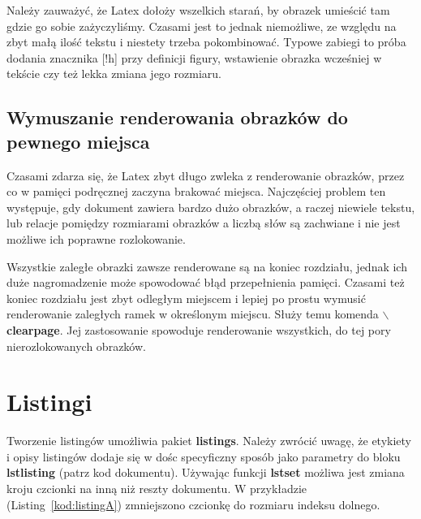 \documentclass[twoside,a4paper]{book}
\begin{document}
Należy zauważyć, że Latex dołoży wszelkich starań, by obrazek umieścić tam gdzie go sobie zażyczyliśmy. Czasami jest to jednak niemożliwe, ze względu na zbyt małą ilość tekstu i niestety trzeba pokombinować. Typowe zabiegi to próba dodania znacznika [!h] przy definicji figury, wstawienie obrazka wcześniej w tekście czy też lekka zmiana jego rozmiaru.

\subsection{Wymuszanie renderowania obrazków do pewnego miejsca}

Czasami zdarza się, że Latex zbyt długo zwleka z renderowanie obrazków, przez co w pamięci podręcznej zaczyna brakować miejsca. Najczęściej problem ten występuje, gdy dokument zawiera bardzo dużo obrazków, a raczej niewiele tekstu, lub relacje pomiędzy rozmiarami obrazków a liczbą słów są zachwiane i nie jest możliwe ich poprawne rozlokowanie.

Wszystkie zaległe obrazki zawsze renderowane są na koniec rozdziału, jednak ich duże nagromadzenie może spowodować błąd przepełnienia pamięci. Czasami też koniec rozdziału jest zbyt odległym miejscem i lepiej po prostu wymusić renderowanie zaległych ramek w określonym miejscu. Służy temu komenda \textbf{$\backslash$clearpage}. Jej zastosowanie spowoduje renderowanie wszystkich, do tej pory nierozlokowanych obrazków.

\section{Listingi}
\label{listingi}
\enlargethispage{-5cm}
Tworzenie listingów umożliwia pakiet \textbf{listings}. Należy zwrócić uwagę, że etykiety i opisy listingów dodaje się w dośc specyficzny sposób jako parametry do bloku \textbf{lstlisting} (patrz kod dokumentu). Używając funkcji \textbf{lstset} możliwa jest zmiana kroju czcionki na inną niż reszty dokumentu. W przykładzie (Listing~\ref{kod:listingA}) zmniejszono czcionkę do rozmiaru indeksu dolnego.
\end{document}
